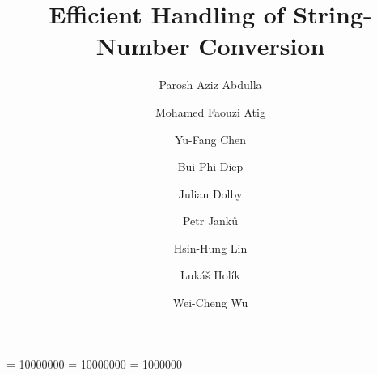 \documentclass[sigplan,screen]{acmart}
\title{Efficient Handling of String-Number Conversion}
\author{Parosh Aziz Abdulla}
\affiliation{
  \institution{Uppsala University}
    \state{Uppsala}
     \country{Sweden}                    %
}
\author{Mohamed Faouzi Atig}
\affiliation{
  \institution{Uppsala University}
      \state{Uppsala}
    \country{Sweden}                    %
}
\author{Yu-Fang Chen}
\affiliation{
  \institution{Academia Sinica}
      \state{Taipei}
    \country{Taiwan}                    %
}
\author{Bui Phi Diep}
\affiliation{
  \institution{Uppsala University}
      \state{Uppsala}
    \country{Sweden}                    %
}
\author{Julian Dolby}
\affiliation{
  \institution{IBM Research}
      \state{NY}
    \country{USA}                    %
}
\author{Petr Janků}
\affiliation{
  \institution{Brno University of Technology}
      \state{Brno}
    \country{Czechia}                    %
}
\author{Hsin-Hung Lin}
\affiliation{
  \institution{Academia Sinica}
      \state{Taipei}
    \country{Taiwan}                    %
}
\author{Lukáš Holík}
\affiliation{
  \institution{Brno University of Technology}
      \state{Brno}
    \country{Czechia}                    %
}
\author{Wei-Cheng Wu}
\affiliation{
  \institution{University of Southern California}
      \state{CA}
    \country{USA}                    %
}
\begin{document}
\clubpenalty = 10000000
\widowpenalty = 10000000
\displaywidowpenalty = 1000000
\newcommand{\hide}[1]{}
\newcommand{\tool}{{\textsf{Z3-Trau}}}
\newcommand{\dr}{\mathcal{R}}
\newcommand{\nat}{\mathbb{N}}
\newcommand{\integers}{\mathbb{Z}}
\newcommand{\todo}[1]{{\color{blue}TODO: #1}}
\newcommand{\lh}[1]{{\color{orange}Lukas: #1}}
\newcommand{\changed}[1]{#1}

\newcommand{\yfc}[1]{{\color{blue}YFC: #1}}
\newcommand{\petr}[1]{{\color{pink}Petr: #1}}
\newcommand{\chatAt}[2]{\mbox{\textsf{charAt}($#1$, $#2$)}}
\newcommand{\ite}[3]{\mbox{\textsf{ite}($#1$, $#2$, $#3$)}}
\newcommand{\sti}[1]{\mbox{\textsf{toNum}($#1$)}}
\newcommand{\its}[1]{\mbox{\textsf{toStr}($#1$)}}
\newcommand{\varn}{\mbox{$Z$}}
\newcommand{\vars}{\mbox{$X$}}
\newcommand{\cvars}{\mbox{$\mathbb{V}_{\Sigma_\epsilon}$}}
\newcommand{\pvars}{\mbox{$\mathbb{V}_{\sharp}$}}
\newcommand{\cvarone}{V}
\newcommand{\cvartwo}{V'}
\newcommand{\cvar}{V}
\newcommand{\modelsof}[1]{[\![#1]\!]}
\newcommand{\true}{\mbox{$\mathsf{true}$}}
\newcommand{\false}{\mbox{$\mathsf{false}$}}
\newcommand{\enc}[1]{[\![#1]\!]}
\newcommand{\parikhof}[1]{\mathbb{P}{(#1)}}
\newcommand{\parikhwof}[2]{|#1|_{#2}}
\newcommand{\semof}[1]{\modelsof{#1}}
\newcommand{\decode}[1]{\mathit{decode_{#1}}}
\newcommand{\parikhfof}[1]{\Phi_{\mathbb{P}}(#1)} %
\newcommand{\pim}{I_{\#}}
\newcommand{\syncop}{\times}
\newcommand{\syncof}[2]{#1 \syncop #2}
\newcommand{\syncfof}[2]{\Psi_{\syncof {#1} {#2}}}
\newcommand{\syncT}{T_\syncop}
\newcommand{\pvarsof}[1]{\#{#1}}
\newcommand{\pvar}{\pvarsof V}
\newcommand{\pvarone}{\pvarsof V}
\newcommand{\pvartwo}{\pvarsof {V'}}
\newcommand{\defeq}{::=}
\newcommand{\encode}[1]{\mathit{encode}_{#1}}
\newcommand{\eqwrt}[1]{=_{#1}}
\newcommand{\iequiv}{\equiv}
\newcommand{\restrict}[2]{#1_{#2}}
\newcommand{\underf}[2]{\mathit{flatten}_#1(#2)}
\newcommand{\paf}{\psi}

\newcommand\pa{P}
\newcommand{\leftA}{\pa^{\mathit{left}}}
\newcommand{\rightA}{\pa^{\mathit{right}}}
\newcommand{\leftV}{V^{\mathit{left}}}
\newcommand{\rightV}{V^{\mathit{right}}}
\newcommand\renvars{V_\dr^\mathsf{ver}}
\end{document}
